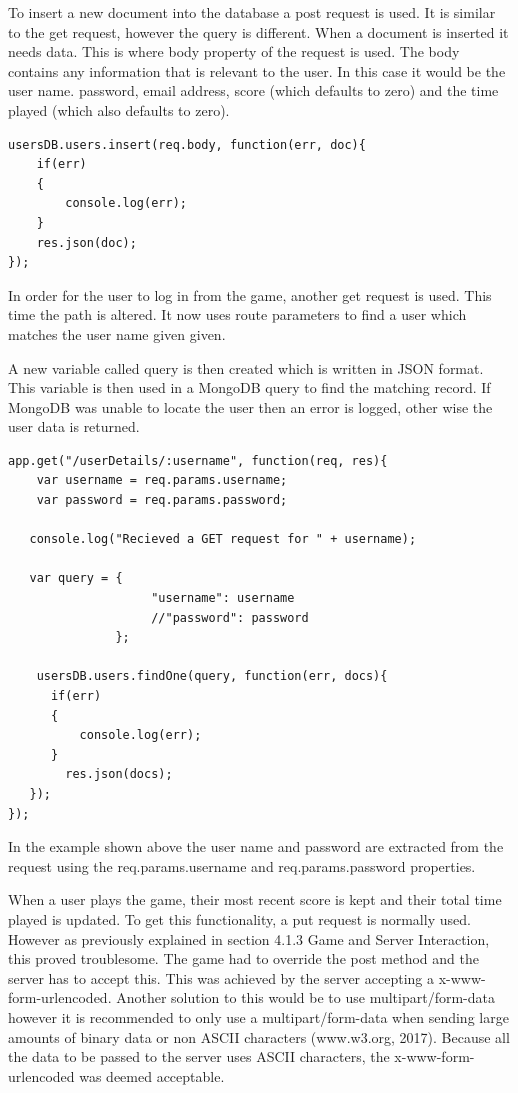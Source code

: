 \documentclass[12pt]{article}
\begin{document}
To insert a new document into the database a post request is used. It is similar to the get request, however the query is different. When a document is inserted it needs data. This is where body property of the request is used. The body contains any information that is relevant to the user. In this case it would be the user name. password, email address, score (which defaults to zero) and the time played (which also defaults to zero). 

\begin{lstlisting}
usersDB.users.insert(req.body, function(err, doc){
	if(err)
	{
		console.log(err);
	}
	res.json(doc);
});
\end{lstlisting}

In order for the user to log in from the game, another get request is used. This time the path is altered. It now uses route parameters to find a user which matches the user name given given.

A new variable called query is then created which is written in JSON format. This variable is then used in a MongoDB query to find the matching record. If MongoDB was unable to locate the user then an error is logged, other wise the user data is returned. 

\begin{lstlisting}
app.get("/userDetails/:username", function(req, res){
    var username = req.params.username;
    var password = req.params.password;

   console.log("Recieved a GET request for " + username);

   var query = {
                    "username": username
                    //"password": password
               };

    usersDB.users.findOne(query, function(err, docs){
      if(err)
      {
          console.log(err);
      }
        res.json(docs);
   });
});
\end{lstlisting}

In the example shown above the user name and password are extracted from the request using the req.params.username and req.params.password properties.

When a user plays the game, their most recent score is kept and their total time played is updated. To get this functionality, a put request is normally used. However as previously explained in section 4.1.3 Game and Server Interaction, this proved troublesome. The game had to override the post method and the server has to accept this. This was achieved by the server accepting a x-www-form-urlencoded. Another solution to this would be to use multipart/form-data however it is recommended to only use a multipart/form-data when sending large amounts of binary data or non ASCII characters (www.w3.org, 2017). Because all the data to be passed to the server uses ASCII characters, the x-www-form-urlencoded was deemed acceptable. 
\end{document}
